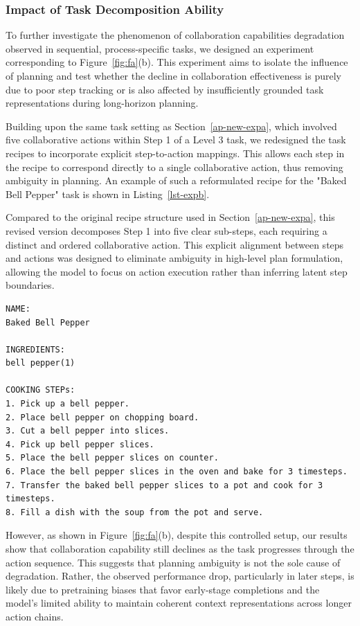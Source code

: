 \documentclass[11pt]{article}
\begin{document}
\subsubsection{Impact of Task Decomposition Ability}
\label{ap-new-expb}

To further investigate the phenomenon of collaboration capabilities degradation observed in sequential, process-specific tasks, we designed an experiment corresponding to Figure~\ref{fig:fa}(b). This experiment aims to isolate the influence of planning and test whether the decline in collaboration effectiveness is purely due to poor step tracking or is also affected by insufficiently grounded task representations during long-horizon planning.

Building upon the same task setting as Section~\ref{ap-new-expa}, which involved five collaborative actions within Step 1 of a Level 3 task, we redesigned the task recipes to incorporate explicit step-to-action mappings. This allows each step in the recipe to correspond directly to a single collaborative action, thus removing ambiguity in planning. An example of such a reformulated recipe for the "Baked Bell Pepper" task is shown in Listing~\ref{lst-expb}.

Compared to the original recipe structure used in Section~\ref{ap-new-expa}, this revised version decomposes Step 1 into five clear sub-steps, each requiring a distinct and ordered collaborative action. This explicit alignment between steps and actions was designed to eliminate ambiguity in high-level plan formulation, allowing the model to focus on action execution rather than inferring latent step boundaries.

\begin{lstlisting}[caption={Step-to-action mapping recipe of "Baked Bell Pepper"},label={lst-expb}]
NAME:
Baked Bell Pepper

INGREDIENTS:
bell pepper(1)

COOKING STEPs:
1. Pick up a bell pepper.    
2. Place bell pepper on chopping board.   
3. Cut a bell pepper into slices.    
4. Pick up bell pepper slices.    
5. Place the bell pepper slices on counter.
6. Place the bell pepper slices in the oven and bake for 3 timesteps.  
7. Transfer the baked bell pepper slices to a pot and cook for 3 timesteps.
8. Fill a dish with the soup from the pot and serve.
\end{lstlisting}


However, as shown in Figure~\ref{fig:fa}(b), despite this controlled setup, our results show that collaboration capability still declines as the task progresses through the action sequence. This suggests that planning ambiguity is not the sole cause of degradation. Rather, the observed performance drop, particularly in later steps, is likely due to pretraining biases that favor early-stage completions and the model's limited ability to maintain coherent context representations across longer action chains.
\end{document}
